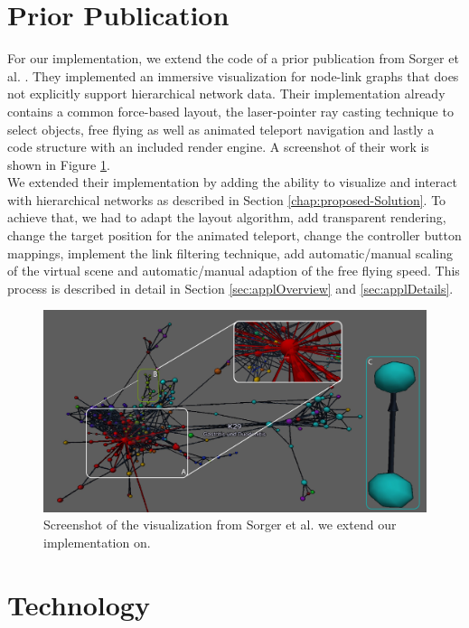 \section{Prior Publication}
For our implementation, we extend the code of a prior publication from Sorger et al. \cite{sorger_immersive_2019}. 
They implemented an immersive visualization for node-link graphs that does not explicitly support hierarchical network data. Their implementation already contains a common force-based layout, the laser-pointer ray casting technique to select objects, free flying as well as animated teleport navigation and lastly a code structure with an included render engine. A screenshot of their work is shown in Figure \ref{fig:priorPublication}.\\
We extended their implementation by adding the ability to visualize and interact with hierarchical networks as described in Section \ref{chap:proposed-Solution}. To achieve that, we had to adapt the layout algorithm, add transparent rendering, change the target position for the animated teleport, change the controller button mappings, implement the link filtering technique, add automatic/manual scaling of the virtual scene and automatic/manual adaption of the free flying speed.
This process is described in detail in Section \ref{sec:applOverview} and \ref{sec:applDetails}.

\begin{figure}[!hbt]
    \centering
    \includegraphics[width=\textwidth]{graphics/screenshotPriorPublication.jpg}
    \caption{Screenshot of the visualization from Sorger et al. \cite{sorger_immersive_2019} we extend our implementation on.}
    \label{fig:priorPublication}
\end{figure}

\section{Technology}

